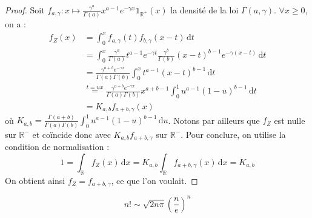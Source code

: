 	\begin{proof}
		Soit $f_{a,\gamma} : x \mapsto \frac{\gamma^a}{\Gamma(a)} x^{a-1} e^{-\gamma x} \mathbb{1}_{\mathbb{R}^+}(x)$ la densité de la loi $\Gamma(a, \gamma)$. $\forall x \geq 0$, on a :
		\begin{align*}
			f_Z(x) & = \int_0^x f_{a, \gamma}(t)f_{b, \gamma}(x-t) \, \mathrm{d}t \\
			& = \int_0^x \frac{\gamma^a}{\Gamma(a)} t^{a-1} e^{-\gamma t} \frac{\gamma^b}{\Gamma(b)} (x-t)^{b-1} e^{-\gamma (x-t)} \, \mathrm{d}t \\
			& = \frac{\gamma^{a+b} e^{-\gamma x}}{\Gamma(a) \Gamma(b)} \int_0^x t^{a-1} (x-t)^{b-1} \, \mathrm{d}t \\
			& \overset{t=ux}{=} \frac{\gamma^{a+b} e^{-\gamma x}}{\Gamma(a) \Gamma(b)} x^{a+b-1} \int_0^1 u^{a-1} (1-u)^{b-1} \, \mathrm{d}t \\
			& = K_{a,b} f_{a+b, \gamma}(x)
		\end{align*}
		où $K_{a,b} = \frac{\Gamma(a+b)}{\Gamma(a) \Gamma(b)} \int_0^1 u^{a-1} (1-u)^{b-1} \, \mathrm{d}u$. Notons par ailleurs que $f_Z$ est nulle sur $\mathbb{R}^-$ et coïncide donc avec $K_{a,b} f_{a+b, \gamma}$ sur $\mathbb{R}^-$.
		\newpar
		Pour conclure, on utilise la condition de normalisation :
		\[ 1 = \int_{\mathbb{R}} f_Z(x) \, \mathrm{d}x = K_{a,b} \int_{\mathbb{R}} f_{a+b, \gamma}(x) \, \mathrm{d}x = K_{a,b} \]
		On obtient ainsi $f_Z = f_{a+b, \gamma}$, ce que l'on voulait.
	\end{proof}


	\begin{theorem}
		\[ n! \sim \sqrt{2n\pi} \left(\frac{n}{e} \right)^n \]
	\end{theorem}

